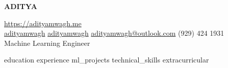 \documentclass[a4paper, 10pt]{article}
\begin{document}
\begin{center}
	\vspace*{-10pt}
	\begin{center}
		\uppercase{\Huge \bfseries Aditya }
	\end{center}
	\vspace{4pt}
	\href{https://adityamwagh.me}{https://adityamwagh.me} \\

	\vspace{4pt}
	\faLinkedin\space{} \href{https://linkedin.com/in/adityamwagh}{adityamwagh} \space{}
	\faGithub{} \space{} \href{https://github.com/adityamwagh}{adityamwagh} \space{}
	\faAt{} \space{} \href{mailto:adityamwagh@outlook.com}{adityamwagh@outlook.com} \space{}
	\faPhone{} \space{} (929) 424 1931 \\

	\vspace{8pt}
	Machine Learning Engineer
\end{center}

\justifying{}
{education}
{experience}
{ml_projects}
{technical_skills}
{extracurricular}
\end{document}
